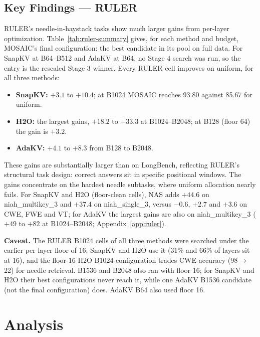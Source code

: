\documentclass[11pt]{article}
\begin{document}
\subsection{Key Findings — RULER}

RULER's needle-in-haystack tasks show much larger gains from per-layer optimization. Table~\ref{tab:ruler-summary} gives, for each method and budget, MOSAIC's final configuration: the best candidate in its pool on full data. For SnapKV at B64--B512 and AdaKV at B64, no Stage 4 search was run, so the entry is the rescaled Stage 3 winner. Every RULER cell improves on uniform, for all three methods:

\begin{itemize}
\item \textbf{SnapKV:} $+3.1$ to $+10.4$; at B1024 MOSAIC reaches 93.80 against 85.67 for uniform.
\item \textbf{H2O:} the largest gains, $+18.2$ to $+33.3$ at B1024--B2048; at B128 (floor 64) the gain is $+3.2$.
\item \textbf{AdaKV:} $+4.1$ to $+8.3$ from B128 to B2048.
\end{itemize}

These gains are substantially larger than on LongBench, reflecting RULER's structural task design: correct answers sit in specific positional windows. The gains concentrate on the hardest needle subtasks, where uniform allocation nearly fails. For SnapKV and H2O (floor-clean cells), NAS adds $+44.6$ on niah\_multikey\_3 and $+37.4$ on niah\_single\_3, versus $-0.6$, $+2.7$ and $+3.6$ on CWE, FWE and VT; for AdaKV the largest gains are also on niah\_multikey\_3 ($+49$ to $+82$ at B1024--B2048; Appendix~\ref{app:ruler}).

\textbf{Caveat.} The RULER B1024 cells of all three methods were searched under the earlier per-layer floor of 16; SnapKV and H2O use it (31\% and 66\% of layers sit at 16), and the floor-16 H2O B1024 configuration trades CWE accuracy (98$\rightarrow$22) for needle retrieval. B1536 and B2048 also ran with floor 16; for SnapKV and H2O their best configurations never reach it, while one AdaKV B1536 candidate (not the final configuration) does. AdaKV B64 also used floor 16.




\section{Analysis}
\end{document}
